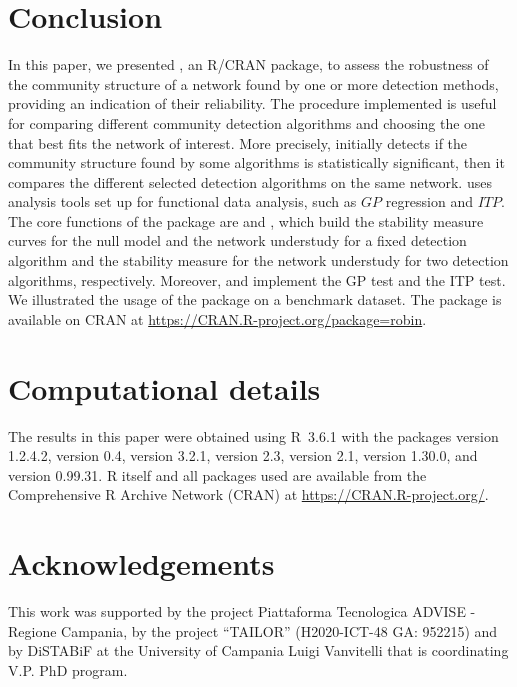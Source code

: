 \section{Conclusion} \label{sec:Conclusion}
In this paper, we presented , an R/CRAN package, to assess the robustness of the community structure of a network found by one or more detection methods, providing an indication of their reliability. The procedure implemented is useful for comparing different community detection algorithms and choosing the one that best fits the network of interest. More precisely,  initially detects if the community structure found by some algorithms is statistically significant, then it compares the different selected detection algorithms on the same network.  uses analysis tools set up for functional data analysis, such as $GP$ regression and $ITP$. The core functions of the package are  and , which build the stability measure curves for the null model and the network understudy for a fixed detection algorithm and the stability measure for the network understudy for two detection algorithms, respectively. Moreover,  and  implement the GP test and the ITP test. We illustrated the usage of the package on a benchmark dataset. The package is available on CRAN at \url{https://CRAN.R-project.org/package=robin}.



\section{Computational details}

The results in this paper were obtained using R~3.6.1 with the packages  version 1.2.4.2,   version 0.4,  version 3.2.1,   version 2.3,   version 2.1,  version 1.30.0, and  version 0.99.31. R itself and all packages used are available from the Comprehensive R Archive Network (CRAN) at \url{https://CRAN.R-project.org/}.


\section{Acknowledgements}

This work was supported by the project Piattaforma Tecnologica ADVISE - Regione Campania, by the project “TAILOR” (H2020-ICT-48 GA: 952215) and by DiSTABiF at the University of Campania Luigi Vanvitelli that is coordinating V.P. PhD program. 

